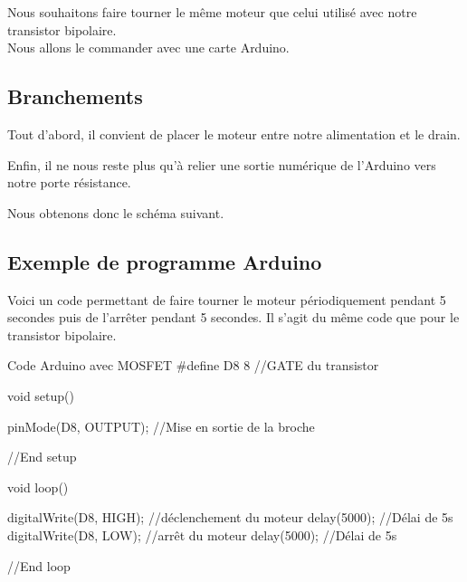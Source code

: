      Nous souhaitons faire tourner le même moteur que celui utilisé avec notre transistor bipolaire.\\
     Nous allons le commander avec une carte Arduino.

     \subsection{Branchements}

     Tout d'abord, il convient de placer le moteur entre notre alimentation et le drain.\\
     
 
 
     Enfin, il ne nous reste plus qu'à relier une sortie numérique de l'Arduino vers notre porte  résistance.
 
     Nous obtenons donc le schéma suivant.
 
  
     \subsection{Exemple de programme Arduino}
 
     Voici un code permettant de faire tourner le moteur périodiquement pendant 5 secondes puis de l'arrêter pendant 5 secondes. Il s'agit du même code que pour le transistor bipolaire.
 
 \begin{Cpp}{Code Arduino avec MOSFET}
 #define D8 8     //GATE du transistor
 
 void setup() {
 
   pinMode(D8, OUTPUT); //Mise en sortie de la broche
 
 }//End setup
 
 void loop() {
 
   digitalWrite(D8, HIGH);    //déclenchement du moteur
   delay(5000);               //Délai de 5s
   digitalWrite(D8, LOW);     //arrêt du moteur
   delay(5000);               //Délai de 5s
 
 }//End loop
 
 \end{Cpp}
